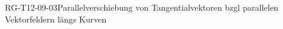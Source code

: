 
\begin{DEF}{RG-T12-09-03}{Parallelverschiebung von Tangentialvektoren bzgl parallelen Vektorfeldern längs Kurven}
\end{DEF}
